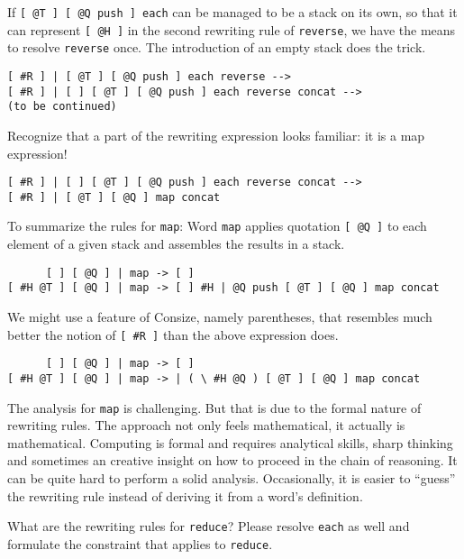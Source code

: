 If \verb|[ @T ] [ @Q push ] each| can be managed to be a stack on its own, so that it can represent \verb|[ @H ]| in the second rewriting rule of \verb|reverse|, we have the means to resolve \verb|reverse| once. The introduction of an empty stack does the trick.

\begin{verbatim}
[ #R ] | [ @T ] [ @Q push ] each reverse -->
[ #R ] | [ ] [ @T ] [ @Q push ] each reverse concat -->
(to be continued)
\end{verbatim}

Recognize that a part of the rewriting expression looks familiar: it is a map expression!

\begin{verbatim}
[ #R ] | [ ] [ @T ] [ @Q push ] each reverse concat -->
[ #R ] | [ @T ] [ @Q ] map concat
\end{verbatim}

To summarize the rules for \verb|map|: Word \verb|map| applies quotation \verb|[ @Q ]| to each element of a given stack and assembles the results in a stack.

\begin{verbatim}
      [ ] [ @Q ] | map -> [ ]
[ #H @T ] [ @Q ] | map -> [ ] #H | @Q push [ @T ] [ @Q ] map concat
\end{verbatim}

We might use a feature of Consize, namely parentheses, that resembles much better the notion of \verb|[ #R ]| than the above expression does.

\begin{verbatim}
      [ ] [ @Q ] | map -> [ ]
[ #H @T ] [ @Q ] | map -> | ( \ #H @Q ) [ @T ] [ @Q ] map concat
\end{verbatim}

The analysis for \verb|map| is challenging. But that is due to the formal nature of rewriting rules. The approach not only feels mathematical, it actually is mathematical. Computing is formal and requires analytical skills, sharp thinking and sometimes an creative insight on how to proceed in the chain of reasoning. It can be quite hard to perform a solid analysis. Occasionally, it is easier to ``guess'' the rewriting rule instead of deriving it from a word's definition.

\begin{exercise}\label{ex:reduce}
What are the rewriting rules for \verb|reduce|? Please resolve \verb|each| as well and formulate the constraint that applies to \verb|reduce|.
\end{exercise}

